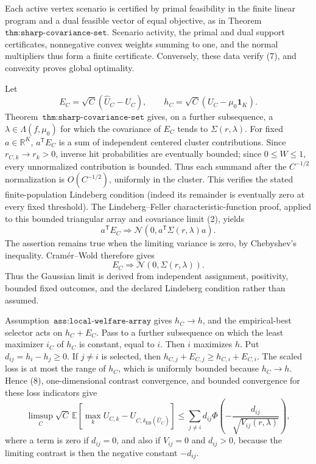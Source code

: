 Each active vertex scenario is certified by primal feasibility in the finite linear program and a dual feasible vector of equal objective, as in Theorem~\(\texttt{thm:sharp-covariance-set}\). Scenario activity, the primal and dual support certificates, nonnegative convex weights summing to one, and the normal multipliers thus form a finite certificate. Conversely, these data verify (7), and convexity proves global optimality.

Let
\[
E_C=\sqrt C(\widehat U_C-U_C),\qquad h_C=\sqrt C(U_C-\mu_0\mathbf1_K).
\]
Theorem~\(\texttt{thm:sharp-covariance-set}\) gives, on a further subsequence, a \(\lambda\in\Lambda(f,\mu_0)\) for which the covariance of \(E_C\) tends to \(\Sigma(r,\lambda)\). For fixed \(a\in\mathbb R^K\), \(a^{\mathsf T}E_C\) is a sum of independent centered cluster contributions. Since \(r_{C,k}\to r_k>0\), inverse hit probabilities are eventually bounded; since \(0\le W\le1\), every unnormalized contribution is bounded. Thus each summand after the \(C^{-1/2}\) normalization is \(O(C^{-1/2})\), uniformly in the cluster. This verifies the stated finite-population Lindeberg condition (indeed its remainder is eventually zero at every fixed threshold). The Lindeberg--Feller characteristic-function proof, applied to this bounded triangular array and covariance limit (2), yields
\[
a^{\mathsf T}E_C\Rightarrow\mathcal N(0,a^{\mathsf T}\Sigma(r,\lambda)a).
\]
The assertion remains true when the limiting variance is zero, by Chebyshev's inequality. Cram\'er--Wold therefore gives
\[
E_C\Rightarrow\mathcal N(0,\Sigma(r,\lambda)).
\tag{8}
\]
Thus the Gaussian limit is derived from independent assignment, positivity, bounded fixed outcomes, and the declared Lindeberg condition rather than assumed.

Assumption~\(\texttt{ass:local-welfare-array}\) gives \(h_C\to h\), and the empirical-best selector acts on \(h_C+E_C\). Pass to a further subsequence on which the least maximizer \(i_C\) of \(h_C\) is constant, equal to \(i\). Then \(i\) maximizes \(h\). Put \(d_{ij}=h_i-h_j\ge0\). If \(j\ne i\) is selected, then \(h_{C,j}+E_{C,j}\ge h_{C,i}+E_{C,i}\). The scaled loss is at most the range of \(h_C\), which is uniformly bounded because \(h_C\to h\). Hence (8), one-dimensional contrast convergence, and bounded convergence for these loss indicators give
\[
\limsup_C\sqrt C\,\mathbb E\left[\max_kU_{C,k}-U_{C,\delta_{\mathrm{EB}}(\widehat U_C)}\right]
\le\sum_{j\ne i}d_{ij}\Phi\left(-\frac{d_{ij}}{\sqrt{V_{ij}(r,\lambda)}}\right),
\tag{9}
\]
where a term is zero if \(d_{ij}=0\), and also if \(V_{ij}=0\) and \(d_{ij}>0\), because the limiting contrast is then the negative constant \(-d_{ij}\).

